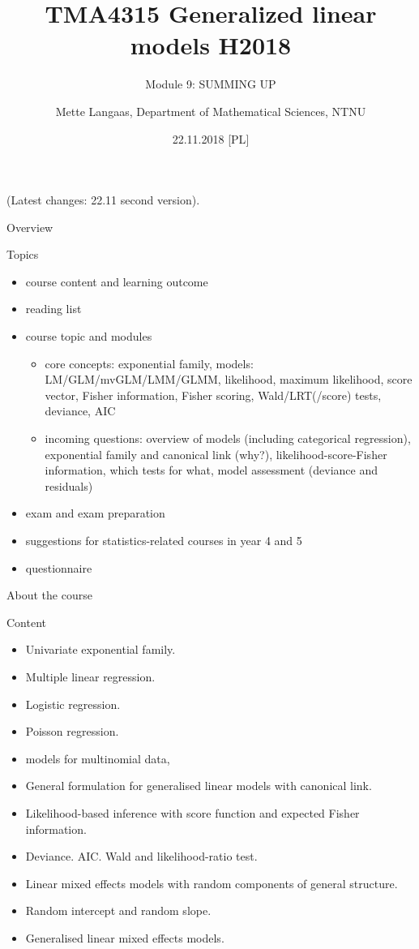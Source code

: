 \documentclass[
  ignorenonframetext,
]{beamer}
\title{TMA4315 Generalized linear models H2018}
\subtitle{Module 9: SUMMING UP}
\author{Mette Langaas, Department of Mathematical Sciences, NTNU}
\date{22.11.2018 {[}PL{]}}
\providecommand{\tightlist}{%
  \setlength{\itemsep}{0pt}\setlength{\parskip}{0pt}}
\begin{document}
\frame{\titlepage}

\begin{frame}
(Latest changes: 22.11 second version).
\end{frame}

\begin{frame}{Overview}
\protect\hypertarget{overview}{}
\begin{block}{Topics}
\protect\hypertarget{topics}{}
\begin{itemize}
\tightlist
\item
  course content and learning outcome
\item
  reading list
\item
  course topic and modules

  \begin{itemize}
  \tightlist
  \item
    core concepts: exponential family, models: LM/GLM/mvGLM/LMM/GLMM,
    likelihood, maximum likelihood, score vector, Fisher information,
    Fisher scoring, Wald/LRT(/score) tests, deviance, AIC
  \item
    incoming questions: overview of models (including categorical
    regression), exponential family and canonical link (why?),
    likelihood-score-Fisher information, which tests for what, model
    assessment (deviance and residuals)
  \end{itemize}
\item
  exam and exam preparation
\item
  suggestions for statistics-related courses in year 4 and 5
\item
  questionnaire
\end{itemize}
\end{block}
\end{frame}

\begin{frame}{About the course}
\protect\hypertarget{about-the-course}{}
\begin{block}{Content}
\protect\hypertarget{content}{}
\begin{itemize}
\tightlist
\item
  Univariate exponential family.
\item
  Multiple linear regression.
\item
  Logistic regression.
\item
  Poisson regression.
\item
  models for multinomial data,
\item
  General formulation for generalised linear models with canonical link.
\item
  Likelihood-based inference with score function and expected Fisher
  information.
\item
  Deviance. AIC. Wald and likelihood-ratio test.
\item
  Linear mixed effects models with random components of general
  structure.
\item
  Random intercept and random slope.
\item
  Generalised linear mixed effects models.
\end{itemize}
\end{block}
\end{frame}
\end{document}
